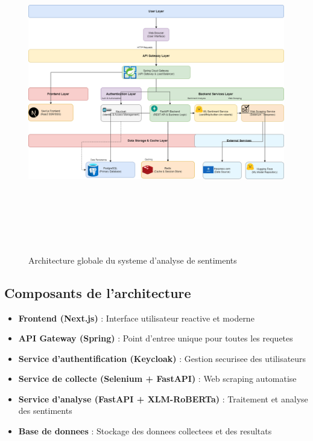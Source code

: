 \begin{figure}[H]
\centering
\includegraphics[height=14cm , width=\textwidth]{assets/images/arch.png}
\caption{Architecture globale du systeme d'analyse de sentiments}
\label{fig:architecture}
\end{figure}

\subsection{Composants de l'architecture}

\begin{itemize}
    \item \textbf{Frontend (Next.js)} : Interface utilisateur reactive et moderne
    \item \textbf{API Gateway (Spring)} : Point d'entree unique pour toutes les requetes
    \item \textbf{Service d'authentification (Keycloak)} : Gestion securisee des utilisateurs
    \item \textbf{Service de collecte (Selenium + FastAPI)} : Web scraping automatise
    \item \textbf{Service d'analyse (FastAPI + XLM-RoBERTa)} : Traitement et analyse des sentiments
    \item \textbf{Base de donnees} : Stockage des donnees collectees et des resultats
\end{itemize}

